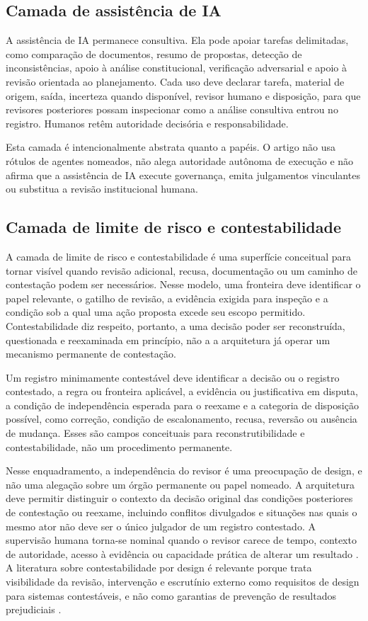 \documentclass[11pt]{article}
\begin{document}
\subsection{Camada de assistência de IA}

A assistência de IA permanece consultiva. Ela pode apoiar tarefas delimitadas,
como comparação de documentos, resumo de propostas, detecção de
inconsistências, apoio à análise constitucional, verificação adversarial e
apoio à revisão orientada ao planejamento. Cada uso deve declarar tarefa,
material de origem, saída, incerteza quando disponível, revisor humano e
disposição, para que revisores posteriores possam inspecionar como a análise
consultiva entrou no registro. Humanos retêm autoridade decisória e
responsabilidade.

Esta camada é intencionalmente abstrata quanto a papéis. O artigo não usa
rótulos de agentes nomeados, não alega autoridade autônoma de execução e não
afirma que a assistência de IA execute governança, emita julgamentos
vinculantes ou substitua a revisão institucional humana.

\subsection{Camada de limite de risco e contestabilidade}

A camada de limite de risco e contestabilidade é uma superfície conceitual
para tornar visível quando revisão adicional, recusa, documentação ou um
caminho de contestação podem ser necessários. Nesse modelo, uma fronteira deve
identificar o papel relevante, o gatilho de revisão, a evidência exigida para
inspeção e a condição sob a qual uma ação proposta excede seu escopo permitido.
Contestabilidade diz respeito, portanto, a uma decisão poder ser reconstruída,
questionada e reexaminada em princípio, não a a arquitetura já operar um
mecanismo permanente de contestação.

Um registro minimamente contestável deve identificar a decisão ou o registro
contestado, a regra ou fronteira aplicável, a evidência ou justificativa em
disputa, a condição de independência esperada para o reexame e a categoria de
disposição possível, como correção, condição de escalonamento, recusa,
reversão ou ausência de mudança. Esses são campos conceituais para
reconstrutibilidade e contestabilidade, não um procedimento permanente.

Nesse enquadramento, a independência do revisor é uma preocupação de design,
e não uma alegação sobre um órgão permanente ou papel nomeado. A arquitetura
deve permitir distinguir o contexto da decisão original das condições
posteriores de contestação ou reexame, incluindo conflitos divulgados e
situações nas quais o mesmo ator não deve ser o único julgador de um registro
contestado. A supervisão humana torna-se nominal quando o revisor carece de
tempo, contexto de autoridade, acesso à evidência ou capacidade prática de
alterar um resultado \citep{tabassi2023airmf,amershi2019guidelines}. A
literatura sobre contestabilidade por design é relevante porque trata
visibilidade da revisão, intervenção e escrutínio externo como requisitos de
design para sistemas contestáveis, e não como garantias de prevenção de
resultados prejudiciais \citep{alfrink2023contestable}.
\end{document}

